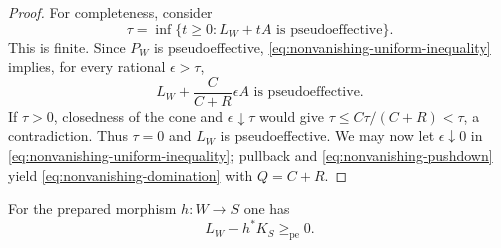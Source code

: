 \begin{proof}
For completeness, consider
\[
 \tau=\inf\{t\ge0:L_W+tA\text{ is pseudoeffective}\}.
\]
This is finite.  Since $P_W$ is pseudoeffective,
\eqref{eq:nonvanishing-uniform-inequality} implies, for every rational
$\epsilon>\tau$,
\[
        L_W+\frac{C}{C+R}\epsilon A
                         \text{ is pseudoeffective}.
\]
If $\tau>0$, closedness of the cone and $\epsilon\downarrow\tau$
would give $\tau\le C\tau/(C+R)<\tau$, a contradiction.  Thus
$\tau=0$ and $L_W$ is pseudoeffective.  We may now let
$\epsilon\downarrow0$ in
\eqref{eq:nonvanishing-uniform-inequality}; pullback and
\eqref{eq:nonvanishing-pushdown} yield
\eqref{eq:nonvanishing-domination} with $Q=C+R$.
\end{proof}

\begin{lemma}\label{lem:nonvanishing-relative}
For the prepared morphism $h:W\to S$ one has
\begin{equation}\label{eq:nonvanishing-relative}
                         L_W-h^*K_S\ge_{\mathrm{pe}}0.
\end{equation}
\end{lemma}

